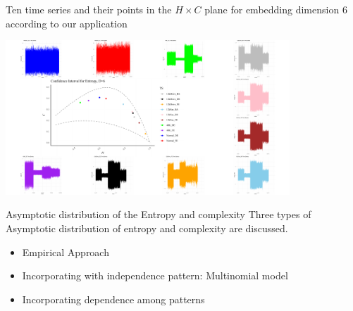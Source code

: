 \documentclass{beamer}
\begin{document}
\begin{frame}{Ten time series and their points in the $H \times C$ plane for embedding dimension 6 according to our application}
	\begin{center}
		\includegraphics[width=0.8\textwidth]{combined plot}
	\end{center}
	
\end{frame}



\begin{frame}{Asymptotic distribution of the Entropy and complexity}
	Three types of Asymptotic distribution of entropy and complexity are discussed.
	\begin{itemize}
		\item Empirical Approach
		\item Incorporating with independence pattern: Multinomial model 
		\item Incorporating dependence among patterns
	\end{itemize}
\end{frame}
\end{document}
